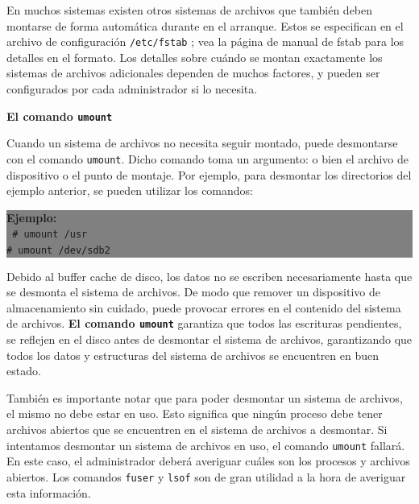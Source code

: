 \documentclass[12pt]{article}
\begin{document}
En muchos sistemas existen otros sistemas de archivos que también deben 
montarse de forma automática durante en el arranque. Estos se especifican 
en el archivo de configuración \texttt{/etc/fstab} ; 
vea la página de manual de fstab para los 
detalles en el formato. Los detalles sobre cuándo se montan exactamente 
los sistemas de archivos adicionales dependen de muchos factores, y 
pueden ser configurados por cada administrador si lo necesita.

\textbf{El comando \texttt{umount}}

Cuando un sistema de archivos no necesita seguir montado, puede 
desmontarse con el comando  \texttt{umount}. Dicho comando toma un 
argumento: o bien el archivo de dispositivo o el punto de montaje. 
Por ejemplo, para desmontar los directorios del ejemplo anterior, 
se pueden utilizar los comandos: 

\colorbox{grey}{\parbox[t]{0.95\linewidth}{ \vspace*{0.5cm} { 
{\bf Ejemplo:} \\
{\tt
\# umount /usr\\
\# umount /dev/sdb2\\ 
}
} \vspace*{0.5cm} } } 

Debido al buffer cache de disco, los datos no se escriben necesariamente 
hasta que se desmonta el sistema de archivos. De modo que remover un 
dispositivo de almacenamiento sin cuidado, puede provocar 
errores en el contenido del sistema de archivos. \textbf{El comando 
\texttt{umount}} garantiza que todos las escrituras pendientes, se 
reflejen en el disco antes de desmontar el sistema de archivos, 
garantizando que todos los datos y estructuras del sistema de archivos 
se encuentren en buen estado.


También es importante notar que para poder desmontar un sistema de archivos,
el mismo no debe estar en uso. Esto significa que ningún proceso debe
tener archivos abiertos que se encuentren en el sistema de archivos a
desmontar. Si intentamos desmontar un sistema de archivos en uso, el 
comando \texttt{umount} fallará. En este caso, el administrador deberá 
averiguar cuáles son los procesos y archivos abiertos. Los comandos 
\texttt{fuser} y \texttt{lsof} son de gran utilidad a la hora de averiguar 
esta información.   
\end{document}
